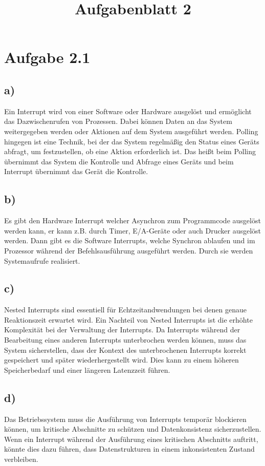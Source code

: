 \documentclass[a4paper,12pt]{article}
\title{Aufgabenblatt 2}
\begin{document}
\maketitle

\section*{Aufgabe 2.1}
\subsection*{a)}
Ein Interrupt wird von einer Software oder Hardware ausgelöst und ermöglicht das
Dazwischenrufen von Prozessen. Dabei können Daten an das System weitergegeben werden oder Aktionen auf dem System ausgeführt werden.
Polling hingegen ist eine Technik, bei der das System regelmäßig den Status eines Geräts abfragt, um festzustellen, ob eine Aktion erforderlich ist.
Das heißt beim Polling übernimmt das System die Kontrolle und Abfrage eines Geräts und beim Interrupt übernimmt das Gerät die Kontrolle.

\subsection*{b)}
Es gibt den Hardware Interrupt welcher Asynchron zum Programmcode ausgelöst werden kann, er kann z.B. durch Timer, E/A-Geräte oder auch
Drucker ausgelöst werden.
Dann gibt es die Software Interrupts, welche Synchron ablaufen und im Prozessor während der Befehlsausführung ausgeführt werden.
Durch sie werden Systemaufrufe realisiert.

\subsection*{c)}
Nested Interrupts sind essentiell für Echtzeitandwendungen bei denen genaue Reaktionszeit erwartet wird.
Ein Nachteil von Nested Interrupts ist die erhöhte Komplexität bei der Verwaltung der Interrupts. 
Da Interrupts während der Bearbeitung eines anderen Interrupts unterbrochen werden können, muss das System sicherstellen, 
dass der Kontext des unterbrochenen Interrupts korrekt gespeichert und später wiederhergestellt wird. 
Dies kann zu einem höheren Speicherbedarf und einer längeren Latenzzeit führen. 

\subsection*{d)}
Das Betriebssystem muss die Ausführung von Interrupts temporär blockieren können, um kritische Abschnitte zu schützen 
und Datenkonsistenz sicherzustellen. 
Wenn ein Interrupt während der Ausführung eines kritischen Abschnitts auftritt, könnte dies dazu führen, 
dass Datenstrukturen in einem inkonsistenten Zustand verbleiben. 
\end{document}
